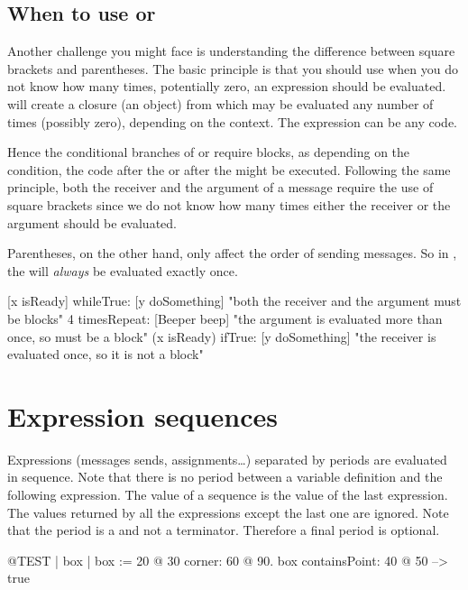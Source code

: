 \documentclass[a4paper,10pt,twoside]{book}
\begin{document}
\subsection{When to use \lct{[ ]} or \lct{( )}}
Another challenge you might face is understanding the difference between square brackets and parentheses.
The basic principle is that you should use \ct{[ ]} when you do not know how many times, potentially zero, an expression should be evaluated.
 will create a  closure (\ie an object) from  which may be evaluated any number of times (possibly zero), depending on the context.
The expression can be any code.

Hence the conditional branches of  or  require blocks, as depending on the condition, the code after the  or after the  might be executed.
Following the same principle, both the receiver and the argument of a  message require the use of square brackets since we do not know how many times either the receiver or the argument should be evaluated.

Parentheses, on the other hand, only affect the order of sending messages.
So in , the  will \emph{always} be evaluated exactly once.

\begin{code}{}
[x isReady] whileTrue: [y doSomething]   "both the receiver and the argument must be blocks"
4 timesRepeat: [Beeper beep]                   "the argument is evaluated more than once, so must be a block"
(x isReady) ifTrue: [y doSomething]           "the receiver is evaluated once, so it is not a block"
\end{code}

\section{Expression sequences}
Expressions (\ie messages sends, assignments\dots) separated by periods are evaluated in sequence.
Note that there is no period between a variable definition and the following expression.
The value of a sequence is the value of the last expression.
The values returned by all the expressions except the last one are ignored.
Note that the period is a  and not a terminator.
Therefore a final period is optional.

\begin{code}{@TEST}
| box |
box := 20 @ 30 corner: 60 @ 90.
box containsPoint: 40 @ 50 --> true
\end{code}
\end{document}
